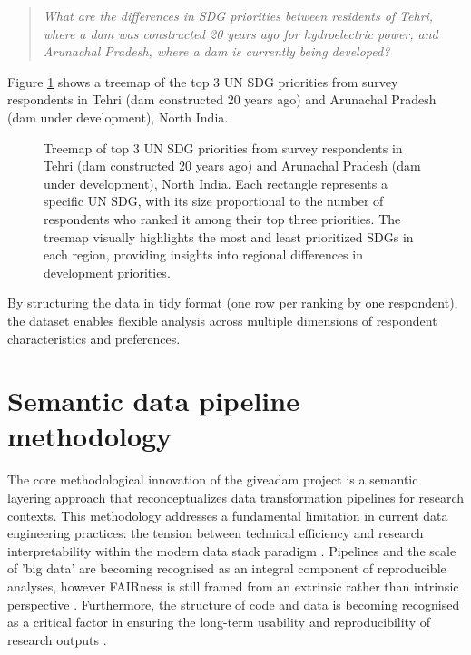 \documentclass{article}
\begin{document}
\begin{quote}
  \textit{What are the differences in SDG priorities between residents of Tehri, where a dam was constructed 20 years ago for hydroelectric power, and Arunachal Pradesh, where a dam is currently being developed?}
\end{quote}

Figure \ref{fig:top3-treemap} shows a treemap of the top 3 UN SDG priorities from survey respondents in Tehri (dam constructed 20 years ago) and Arunachal Pradesh (dam under development), North India.

\begin{figure}[ht]
  \centering
  \caption[Give a dam data]{\label{fig:top3-treemap} Treemap of top 3 UN SDG priorities from survey respondents in Tehri (dam constructed 20 years ago) and Arunachal Pradesh (dam under development), North India. Each rectangle represents a specific UN SDG, with its size proportional to the number of respondents who ranked it among their top three priorities. The treemap visually highlights the most and least prioritized SDGs in each region, providing insights into regional differences in development priorities.}
\end{figure}

By structuring the data in tidy format (one row per ranking by one respondent), the dataset enables flexible analysis across multiple dimensions of respondent characteristics and preferences. 

\section{Semantic data pipeline methodology}
\label{sec:semantic-methodology}

The core methodological innovation of the giveadam project is a semantic layering approach that reconceptualizes data transformation pipelines for research contexts. This methodology addresses a fundamental limitation in current data engineering practices: the tension between technical efficiency and research interpretability within the modern data stack paradigm \cite{prakashWhatDefinesModern2023}. Pipelines and the scale of 'big data' are becoming recognised as an integral component of reproducible analyses, however FAIRness is still framed from an extrinsic rather than intrinsic perspective \cite{leipzigRoleMetadataReproducible2021}. Furthermore, the structure of code and data is becoming recognised as a critical factor in ensuring the long-term usability and reproducibility of research outputs \cite{trisovicRepositoryApproachesImproving2021}. 
\end{document}
